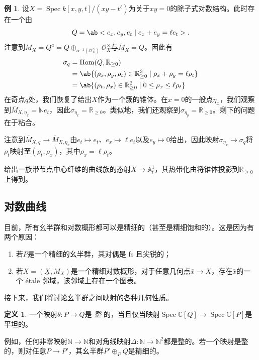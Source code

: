 \documentclass{amsart}
\theoremstyle{definition}
\newtheorem{defn}[thm]{定义}
\newtheorem{exm}[thm]{例}
\theoremstyle{remark}
\theoremstyle{plain}
\theoremstyle{definition}
\theoremstyle{remark}
\newcommand{\A}{\mathbb{A}}
\newcommand{\N}{\mathbb{N}}
\newcommand{\R}{\mathbb{R}}
\newcommand{\C}{\mathbb{C}}
\newcommand{\mc}[1]{\mathcal{#1}}
\newcommand{\ul}[1]{\underline{#1}}
\newcommand{\1}{\mathbf{1}}
\newcommand{\2}{\mathbf{2}}
\newcommand{\3}{\mathbf{3}}
\DeclareMathOperator{\Hom}{Hom}
\DeclareMathOperator{\Spec}{Spec}
\begin{document}
\begin{exm}
    设\(X = \Spec k[x,y,t]/(xy-t^{\ell})\)为关于\(xy = 0\)的除子式对数结构。此时存在一个由
    \[ Q = \ab<e_x, e_y, e_t \mid e_x + e_y = \ell e_t>. \]
    注意到\(M_X = Q^a = Q \oplus_{\alpha^{-1}(\mc{O}_X^{\times})} \mc{O}_X^{\times}\)与\(\bar{M}_X = Q\)。因此有
    \begin{align*}
        \sigma_q &= \Hom(Q, \R_{\geq 0}) \\
        &= \ab\{ (\rho_x, \rho_y, \rho_t) \in \R_{\geq 0}^3 \mid \rho_x + \rho_y = \ell \rho_t \} \\
        &= \ab\{ (\rho_t, \rho_x) \in \R_{\geq 0}^2 \mid 0 \leq \rho_x \leq \ell \rho_t \}
    \end{align*}
在奇点\(q\)处，我们恢复了给出\(X\)作为一个簇的锥体。在\(x = 0\)的一般点\(\eta_x\)，我们观察到\(\bar{M}_{X, \eta_x} = \N e_t\)，因此\(\sigma_{\eta_x} = \R_{\geq 0}\)。类似地，我们还观察到\(\sigma_{\eta_y} = \R_{\geq 0}\)。剩下的问题在于粘合。

    注意到\(\bar{M}_{X, q} \to \bar{M}_{X, \eta_x}\)由\(e_t \mapsto e_t\)、\(e_x \mapsto \ell e_t\)以及\(e_y \mapsto 0\)给出，因此映射\(\sigma_{\eta_x} \to \sigma_q\)将\(\rho_t\)映射至\((\rho_t, \rho_x)\)，其中\(\rho_x = \ell \rho_t\)。

    给出一族带节点中心纤维的曲线族的态射\(X \to \A^1_t\)，其热带化由将锥体投影到\(\R_{\geq 0}\)上得到。
\end{exm}


\subsection{对数曲线}%
\label{sub:Log curves}

目前，所有幺半群和对数概形都可以是精细的（甚至是精细饱和的）。这是因为有两个原因：
\begin{enumerate}
    \item 若\(P\)是一个精细的幺半群，其对偶是 fs 且尖锐的；
    \item 若\(X = (\ul{X}, M_X)\)是一个精细对数概形，对于任意几何点\(\bar{x} \to X\)，存在\(\bar{x}\)的一个 \'etale 邻域，该邻域上存在一个图表。
\end{enumerate}

接下来，我们将讨论幺半群之间映射的各种几何性质。
\begin{defn}
    一个映射\(\theta \colon P \to Q\)是 \textit{整} 的，当且仅当映射\(\Spec\C[Q] \to \Spec \C[P]\)是平坦的。
\end{defn}

例如，任何非零映射\(\N \to \N\)和对角线映射\(\Delta \colon\N \to \N^2\)都是整的。若一个映射是整的，则对任意\(P \to P'\)，其幺半群\(P' \oplus_P Q\)是精细的。
\end{document}
